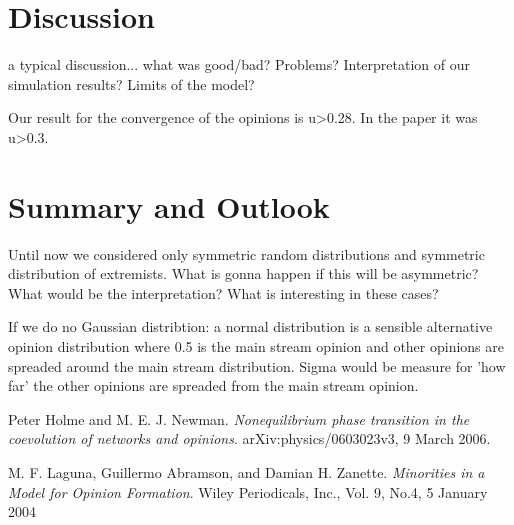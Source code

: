 \documentclass[11pt]{article}
\begin{document}
\section{Discussion}
a typical discussion... what was good/bad? Problems? Interpretation of our simulation results? Limits of the model?

Our result for the convergence of the opinions is u>0.28. In the paper it was u>0.3.

\section{Summary and Outlook}
Until now we considered only symmetric random distributions and symmetric distribution of extremists. What is gonna happen if this will be asymmetric? What would be the interpretation? What is interesting in these cases?


If we do no Gaussian distribtion: a normal distribution is a sensible alternative opinion distribution where 0.5 is the main stream opinion and other opinions are spreaded around the main stream distribution. Sigma would be measure for 'how far' the other opinions are spreaded from the main stream opinion.


\begin{thebibliography}{99}
 Peter Holme and M. E. J. Newman. \textit{Nonequilibrium phase transition in the coevolution of networks and opinions}. arXiv:physics/0603023v3, 9 March 2006.

 M. F. Laguna, Guillermo Abramson, and Damian H. Zanette. \textit{Minorities in a Model for Opinion Formation}. Wiley Periodicals, Inc., Vol. 9, No.4, 5 January 2004

\end{thebibliography} 
\end{document}
